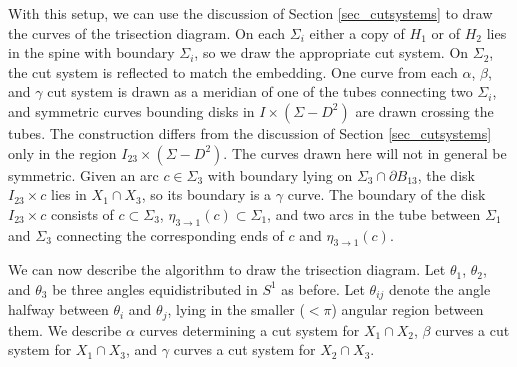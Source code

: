 \documentclass[12pt]{amsart}
\newcommand{\del}{\partial }
\theoremstyle{definition}
\theoremstyle{remark}
\begin{document}
With this setup, we can use the discussion of Section \ref{sec_cutsystems} to draw the curves of the trisection diagram.
On each $\Sigma_i$ either a copy of $H_1$ or of $H_2$ lies in the spine with boundary $\Sigma_i$, so we draw the appropriate cut system.
On $\Sigma_2$, the cut system is reflected to match the embedding.
One curve from each $\alpha$, $\beta$, and $\gamma$ cut system is drawn as a meridian of one of the tubes connecting two $\Sigma_i$, and symmetric curves bounding disks in $I \times (\Sigma - D^2)$ are drawn crossing the tubes.
The construction differs from the discussion of Section \ref{sec_cutsystems} only in the region $I_{23} \times (\Sigma - D^2)$.
The curves drawn here will not in general be symmetric.
Given an arc $c \in \Sigma_3$ with boundary lying on $\Sigma_3 \cap \del B_{13}$, the disk $I_{23} \times c$ lies in $X_1 \cap X_3$, so its boundary is a $\gamma$ curve.
The boundary of the disk $I_{23} \times c$ consists of $c \subset \Sigma_3$, $\eta_{3 \to 1}(c) \subset \Sigma_1$, and two arcs in the tube between $\Sigma_1$ and $\Sigma_3$ connecting the corresponding ends of $c$ and $\eta_{3 \to 1}(c)$.


We can now describe the algorithm to draw the trisection diagram.
Let $\theta_1$, $\theta_2$, and $\theta_3$ be three angles equidistributed in $S^1$ as before.
Let $\theta_{ij}$ denote the angle halfway between $\theta_i$ and $\theta_j$, lying in the smaller ($<\pi$) angular region between them.
We describe $\alpha$ curves determining a cut system for $X_1 \cap X_2$, $\beta$ curves a cut system for $X_1 \cap X_3$, and $\gamma$ curves a cut system for $X_2 \cap X_3$.
\end{document}
